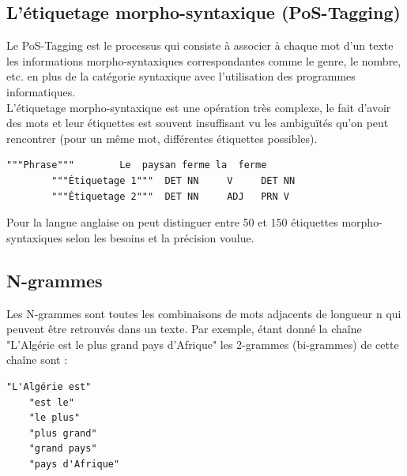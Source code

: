     \subsection{L'étiquetage morpho-syntaxique (PoS-Tagging)}
    Le PoS-Tagging est le processus qui consiste à associer à chaque mot d'un texte les informations morpho-syntaxiques correspondantes comme le genre, le nombre, etc. en plus de la catégorie syntaxique avec l'utilisation des programmes informatiques.\\
    L'étiquetage morpho-syntaxique est une opération très complexe, le fait d'avoir des mots et leur étiquettes est souvent insuffisant vu les ambiguïtés qu'on peut rencontrer (pour un même mot, différentes étiquettes possibles).
    \begin{lstlisting}[style=code]
        """Phrase"""        Le  paysan ferme la  ferme
        """Étiquetage 1"""  DET NN     V     DET NN
        """Étiquetage 2"""  DET NN     ADJ   PRN V
    \end{lstlisting}
    Pour la langue anglaise on peut distinguer entre 50 et 150 étiquettes morpho-syntaxiques selon les besoins et la précision voulue.
    
   
    \subsection{N-grammes}
    Les N-grammes sont toutes les combinaisons de mots adjacents de longueur n qui peuvent être retrouvés dans un texte. Par exemple, étant donné la chaîne "L'Algérie est le plus grand pays d'Afrique" les 2-grammes (bi-grammes) de cette chaîne sont :
    
    \begin{lstlisting}[style=code]
    "L'Algérie est"  
    "est le" 
    "le plus"
    "plus grand"
    "grand pays"
    "pays d'Afrique"
    \end{lstlisting}
    
